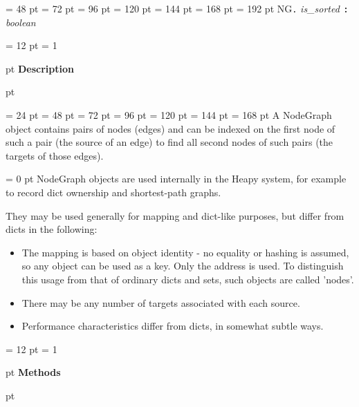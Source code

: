 {{{{\par \noindent  \leftskip = 48 pt  \leftmargini = 72 pt  \leftmarginii = 96 pt  \leftmarginiii = 120 pt  \leftmarginiv = 144 pt  \leftmarginv = 168 pt  \leftmarginvi = 192 pt NG{\large {\tt .\/} {\em is{\_}sorted\/}}~{\bf :}  {\em boolean\/}\par}
\par}
\par}
{\par \pagebreak[3.300000] \noindent \hangindent = 12 pt \hangafter = 1 
{\par \pagebreak[3]  pt \noindent
{\Large {\bf Description\/}}\par {} pt
} \noindent
\par}
{\par \noindent  \leftskip = 24 pt  \leftmargini = 48 pt  \leftmarginii = 72 pt  \leftmarginiii = 96 pt  \leftmarginiv = 120 pt  \leftmarginv = 144 pt  \leftmarginvi = 168 pt A NodeGraph object contains pairs of nodes (edges) and can be indexed
on the first node of such a pair (the source of an edge) to find all
second nodes of such pairs (the targets of those edges).{\par \parindent = 0 pt 
NodeGraph objects are used internally in the Heapy system, for example
to record dict ownership and shortest-path graphs. \par}
{\par 
They may be used generally for mapping and dict-like purposes, but
differ from dicts in the following: \par}
\begin{itemize}
\item  The mapping is based on object identity - no equality or hashing is
  assumed, so any object can be used as a key. Only the address is used.
  To distinguish this usage from that of ordinary dicts and sets, such
  objects are called 'nodes'.\item  There may be any number of targets associated with each source.\item  Performance characteristics differ from dicts, in somewhat subtle ways.
\end{itemize}
\par}
{\par \pagebreak[3.300000] \noindent \hangindent = 12 pt \hangafter = 1 
{\par \pagebreak[3]  pt \noindent
{\Large {\bf Methods\/}}\par {} pt
} \noindent
\par}
}
